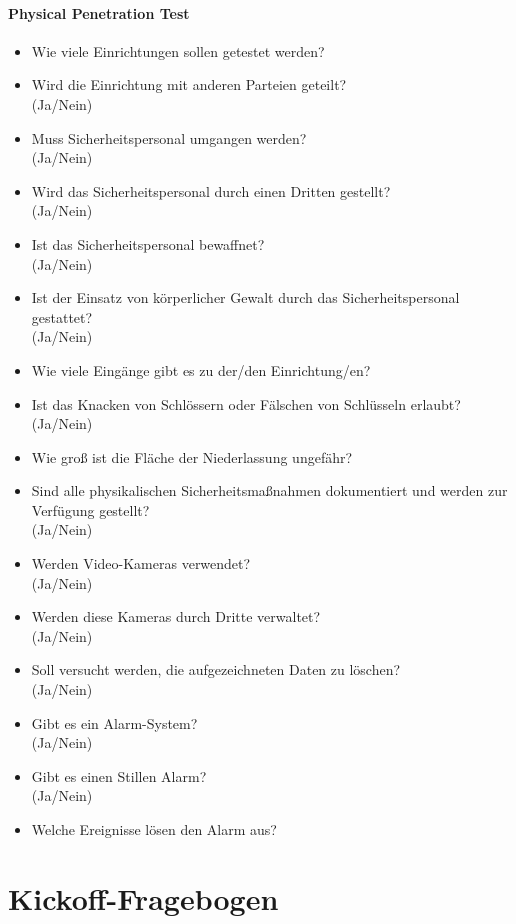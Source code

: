 \paragraph{Physical Penetration Test}
\begin{itemize}
	\item Wie viele Einrichtungen sollen getestet werden?
	\item Wird die Einrichtung mit anderen Parteien geteilt?\\
	(Ja/Nein)
	\item Muss Sicherheitspersonal umgangen werden?\\
	(Ja/Nein)
	\item Wird das Sicherheitspersonal durch einen Dritten gestellt?\\
	(Ja/Nein)
	\item Ist das Sicherheitspersonal bewaffnet?\\
	(Ja/Nein)
	\item Ist der Einsatz von körperlicher Gewalt durch das Sicherheitspersonal gestattet?\\
	(Ja/Nein)
	\item Wie viele Eingänge gibt es zu der/den Einrichtung/en?
	\item Ist das Knacken von Schlössern oder Fälschen von Schlüsseln erlaubt?\\
	(Ja/Nein)
	\item Wie groß ist die Fläche der Niederlassung ungefähr?
	\item Sind alle physikalischen Sicherheitsmaßnahmen dokumentiert und werden zur Verfügung gestellt?\\
	(Ja/Nein)
	\item Werden Video-Kameras verwendet?\\
	(Ja/Nein)
	\item Werden diese Kameras durch Dritte verwaltet?\\
	(Ja/Nein)
	\item Soll versucht werden, die aufgezeichneten Daten zu löschen?\\
	(Ja/Nein)
	\item Gibt es ein Alarm-System?\\
	(Ja/Nein)
	\item Gibt es einen Stillen Alarm?\\
	(Ja/Nein)
	\item Welche Ereignisse lösen den Alarm aus?
\end{itemize}

\section{Kickoff-Fragebogen}\label{ap:kickofffrag}

